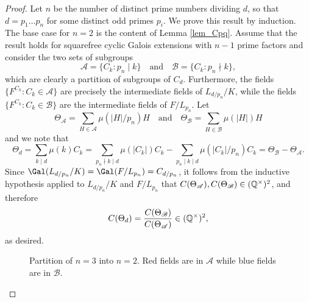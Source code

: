\begin{proof}
    Let $n$ be the number of distinct prime numbers dividing $d$, so that $d=p_1\ldots p_n$ for some distinct odd primes $p_i$. We prove this result by induction. The base case for $n=2$ is the content of Lemma \ref{lem_Cpq}. Assume that the result holds for squarefree cyclic Galois extensions with $n-1$ prime factors and consider the two sets of subgroups
    $$\mathcal{A}=\{C_k:p_n\mid k\}\quad\text{and}\quad\mathcal{B}=\{C_k:p_n\nmid k\},$$
    which are clearly a partition of subgroups of $C_d$. Furthermore, the fields $\{F^{C_k}:C_k\in\mathcal{A}\}$ are precisely the intermediate fields of $L_{d/p_n}/K$, while the fields $\{F^{C_k}:C_k\in\mathcal{B}\}$ are the intermediate fields of $F/L_{p_n}$.
    Let 
    $$\Theta_\mathcal{A}=\sum_{H\in\mathcal{A}}\mu(|H|/p_n)H\quad\text{and}\quad\Theta_\mathcal{B}=\sum_{H\in\mathcal{B}}\mu(|H|)H$$
    and we note that
    \begin{equation}\label{eqn_theta}\tag{8.10}
        \Theta_d=\sum_{k\mid d}\mu(k)C_k=\sum_{p_n\nmid k\mid d}\mu(|C_k|)C_k-\sum_{p_n\mid k\mid d}\mu(|C_k|/p_n)C_k=\Theta_\mathcal{B}-\Theta_\mathcal{A}.
    \end{equation}
    Since $\Gal(L_{d/p_n}/K)=\Gal(F/L_{p_n})=C_{d/p_n}$, it follows from the inductive hypothesis applied to $L_{d/p_n}/K$ and $F/L_{p_n}$ that $C(\Theta_\mathcal{A}),C(\Theta_\mathcal{B})\in(\mathbb{Q}^{\times})^2$, and therefore
    $$C(\Theta_d)=\frac{C(\Theta_\mathcal{B})}{C(\Theta_\mathcal{A})}\in(\mathbb{Q}^{\times})^2,$$ 
    as desired.
    \begin{figure}[!ht]
        \centering
        \caption[short]{Partition of $n=3$ into $n=2$. Red fields are in $\mathcal{A}$ while blue fields are in $\mathcal{B}$.}
    \end{figure}
\end{proof}

